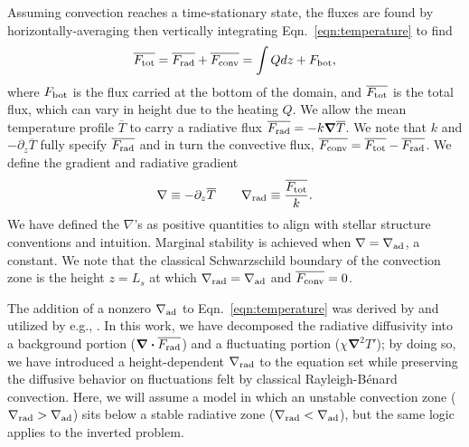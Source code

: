 \documentclass[twocolumn]{aastex631}
\newcommand{\gradrad}{\ensuremath{\nabla_{\rm{rad}}}}
\newcommand{\gradad}{\ensuremath{\nabla_{\rm{ad}}}}
\newcommand{\justgrad}{\ensuremath{\nabla}}
\newcommand{\Fbot}{\ensuremath{F_{\rm{bot}}}}
\newcommand{\Ftot}{\ensuremath{F_{\rm{tot}}}}
\newcommand{\Frad}{\ensuremath{F_{\rm{rad}}}}
\newcommand{\Fconv}{\ensuremath{F_{\rm{conv}}}}
\renewcommand{\vec}[1]{\boldsymbol{#1}}
\renewcommand{\dot}{\vec{\cdot}}
\renewcommand{\bar}[1]{\overline{#1}}
\newcommand{\grad}{\vec{\nabla}}
\begin{document}
Assuming convection reaches a time-stationary state, the fluxes are found by horizontally-averaging then vertically integrating Eqn.~\ref{eqn:temperature} to find
\begin{equation}
\overline{\Ftot} = \overline{\Frad} + \overline{\Fconv} = \int Q dz + \Fbot,
\label{eqn:flux_definition}
\end{equation}
where $\Fbot$ is the flux carried at the bottom of the domain, and $\overline{\Ftot}$ is the total flux, which can vary in height due to the heating $Q$.
We allow the mean temperature profile $\overline{T}$ to carry a radiative flux $\bar{\Frad} = -k \grad \overline{T}$.
We note that $k$ and $-\partial_z \bar{T}$ fully specify $\bar{\Frad}$ and in turn the convective flux, $\bar{\Fconv} = \bar{\Ftot} - \bar{\Frad}$.
We define the gradient and radiative gradient 
\begin{equation}
\justgrad \equiv -\partial_z \bar{T} \qquad
\gradrad \equiv \frac{\bar{\Ftot}}{k}.
\label{eqn:gradrad_definition}
\end{equation}
We have defined the $\justgrad$'s as positive quantities to align with stellar structure conventions and intuition.
Marginal stability is achieved when $\justgrad = \gradad$, a constant.
We note that the classical Schwarzschild boundary of the convection zone is the height $z = L_s$ at which $\gradrad = \gradad$ and $\bar{\Fconv} = 0$.

The addition of a nonzero $\gradad$ to Eqn.~\ref{eqn:temperature} was derived by \citet{spiegel_veronis_1960} and utilized by e.g., \citet{korre_etal_2019}.
In this work, we have decomposed the radiative diffusivity into a background portion ($\grad\dot \bar{\Frad}$) and a fluctuating portion ($\chi \grad^2 T'$); by doing so, we have introduced a height-dependent $\gradrad$ to the equation set while preserving the diffusive behavior on fluctuations felt by classical Rayleigh-B\'{e}nard convection.
Here, we will assume a model in which an unstable convection zone ($\gradrad > \gradad$) sits below a stable radiative zone ($\gradrad < \gradad$), but the same logic applies to the inverted problem.
\end{document}

